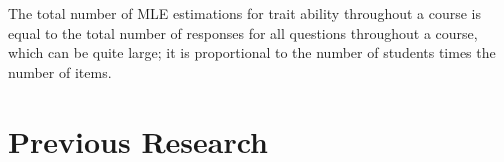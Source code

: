 
The total number of MLE estimations for trait ability throughout a course is
equal to the total number of responses for all questions throughout a course,
which can be quite large; it is proportional to the number of students times
the number of items. 


\section{Previous Research}


